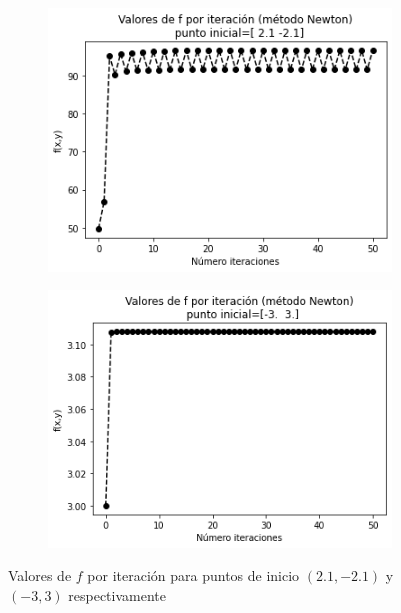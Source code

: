 \documentclass[11pt,a4paper]{article}
\theoremstyle{definition}
\begin{document}
	\begin{figure}[H]
		\centering
		\begin{subfigure}{.5\textwidth}
  		\centering
  		\includegraphics[width=1\textwidth]{images/newton3}
  		\label{fig:sub1}
		\end{subfigure}%
		\begin{subfigure}{.5\textwidth}
  		\centering
  		\includegraphics[width=1\textwidth]{images/newton4}
  		\label{fig:sub2}
		\end{subfigure}
		\caption{Valores de $f$ por iteración para puntos de inicio $(2.1, -2.1)$ y $(-3,3)$ respectivamente}
		\label{fig:test}
	\end{figure}
\end{document}
